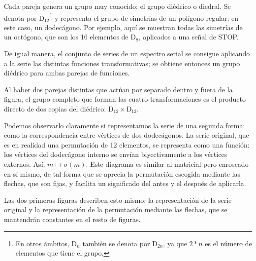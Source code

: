 		Cada pareja genera un grupo muy conocido: el grupo diédrico o diedral. Se denota por D$_{12}$\footnote{En otros ámbitos, D$_n$ también se denota por D$_{2n}$, ya que $2*n$ es el número de elementos que tiene el grupo.} y representa el grupo de simetrías de un polígono regular; en este caso, un dodecágono. Por ejemplo, aquí se muestran todas las simetrías de un octógono, que son los 16 elementos de D$_{8}$, aplicados a una señal de STOP.
		
		{\scriptsize{}}
	
		De igual manera, el conjunto de series de un espectro serial se consigue aplicando a la serie las distintas funciones transformativas; se obtiene entonces un grupo diédrico para ambas parejas de funciones. 
		
		Al haber dos parejas distintas que actúan por separado dentro y fuera de la figura, el grupo completo que forman las cuatro transformaciones es el producto directo de dos copias del diédrico: D$_{12}\times\text{D}_{12}$.
		
		Podemos observarlo claramente si representamos la serie de una segunda forma: como la correspondencia entre vértices de dos dodecágonos. La serie original, que es en realidad una permutación de 12 elementos, se representa como una función: los vértices del dodecágono interno se envían biyectivamente a los vértices externos. Así, $m \longmapsto \sigma(m)$. Este diagrama es similar al matricial pero enroscado en sí mismo, de tal forma que se aprecia la permutación escogida mediante las flechas, que son fijas, y facilita un significado del antes y el después de aplicarla.
		
		Las dos primeras figuras describen esto mismo: la representación de la serie original y la representación de la permutación mediante las flechas, que se mantendrán constantes en el resto de figuras.
		
